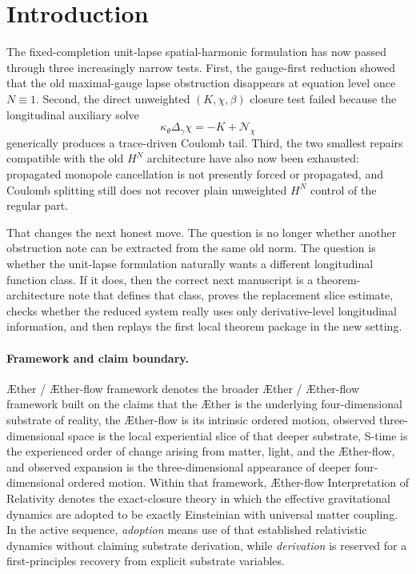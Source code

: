 \documentclass[11pt]{article}
\newcommand{\Aether}{\AE{}ther}
\newcommand{\Aflow}{\AE{}ther-flow}
\newcommand{\TheoryName}{\Aflow{} Interpretation of Relativity}
\newcommand{\TheoryProgram}{\Aether{} / \Aflow{} framework}
\begin{document}
\section{Introduction}

The fixed-completion unit-lapse spatial-harmonic formulation has now passed through three increasingly narrow tests. First, the gauge-first reduction showed that the old maximal-gauge lapse obstruction disappears at equation level once \(N\equiv 1\). Second, the direct unweighted \((K,\chi,\beta)\) closure test failed because the longitudinal auxiliary solve
\begin{equation}
\kappa_\theta \Delta_\gamma \chi
=
-K+\mathcal N_\chi
\label{eq:chiell}
\end{equation}
generically produces a trace-driven Coulomb tail. Third, the two smallest repairs compatible with the old \(H^N\) architecture have also now been exhausted: propagated monopole cancellation is not presently forced or propagated, and Coulomb splitting still does not recover plain unweighted \(H^N\) control of the regular part.

That changes the next honest move. The question is no longer whether another obstruction note can be extracted from the same old norm. The question is whether the unit-lapse formulation naturally wants a different longitudinal function class. If it does, then the correct next manuscript is a theorem-architecture note that defines that class, proves the replacement slice estimate, checks whether the reduced system really uses only derivative-level longitudinal information, and then replays the first local theorem package in the new setting.

\paragraph{Framework and claim boundary.}
\TheoryProgram{} denotes the broader \Aether{} / \Aflow{} framework built on the claims that the \Aether{} is the underlying four-dimensional substrate of reality, the \Aflow{} is its intrinsic ordered motion, observed three-dimensional space is the local experiential slice of that deeper substrate, S-time is the experienced order of change arising from matter, light, and the \Aflow{}, and observed expansion is the three-dimensional appearance of deeper four-dimensional ordered motion. Within that framework, \TheoryName{} denotes the exact-closure theory in which the effective gravitational dynamics are adopted to be exactly Einsteinian with universal matter coupling. In the active sequence, \emph{adoption} means use of that established relativistic dynamics without claiming substrate derivation, while \emph{derivation} is reserved for a first-principles recovery from explicit substrate variables.
\end{document}
